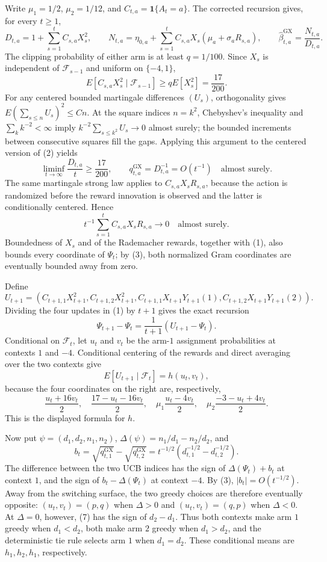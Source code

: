 Write \(\mu_1=1/2\), \(\mu_2=1/12\), and \(C_{t,a}=\mathbf 1\{A_t=a\}\). The corrected recursion gives, for every \(t\ge1\),
\[
 D_{t,a}=1+\sum_{s=1}^t C_{s,a}X_s^2,\qquad
 N_{t,a}=\eta_{0,a}+\sum_{s=1}^t C_{s,a}X_s(\mu_a+\sigma_aR_{s,a}),\qquad
 \widehat\beta^{\mathrm{GX}}_{t,a}=\frac{N_{t,a}}{D_{t,a}}. \tag{1}
\]
The clipping probability of either arm is at least \(q=1/100\). Since \(X_s\) is independent of \(\mathcal F_{s-1}\) and uniform on \(\{-4,1\}\),
\[
 E[C_{s,a}X_s^2\mid\mathcal F_{s-1}]
 \ge qE[X_s^2]=\frac{17}{200}. \tag{2}
\]
For any centered bounded martingale differences \((U_s)\), orthogonality gives \(E(\sum_{s\le n}U_s)^2\le Cn\). At the square indices \(n=k^2\), Chebyshev's inequality and \(\sum_k k^{-2}<\infty\) imply \(k^{-2}\sum_{s\le k^2}U_s\to0\) almost surely; the bounded increments between consecutive squares fill the gaps. Applying this argument to the centered version of (2) yields
\[
 \liminf_{t\to\infty}\frac{D_{t,a}}t\ge\frac{17}{200},
 \qquad q^{\mathrm{GX}}_{t,a}=D_{t,a}^{-1}=O(t^{-1})\quad\text{almost surely}. \tag{3}
\]
The same martingale strong law applies to \(C_{s,a}X_sR_{s,a}\), because the action is randomized before the reward innovation is observed and the latter is conditionally centered. Hence
\[
 t^{-1}\sum_{s=1}^tC_{s,a}X_sR_{s,a}\longrightarrow0
 \quad\text{almost surely}. \tag{4}
\]
Boundedness of \(X_s\) and of the Rademacher rewards, together with (1), also bounds every coordinate of \(\Psi_t\); by (3), both normalized Gram coordinates are eventually bounded away from zero.

Define
\[
 U_{t+1}=(C_{t+1,1}X_{t+1}^2,C_{t+1,2}X_{t+1}^2,
 C_{t+1,1}X_{t+1}Y_{t+1}(1),C_{t+1,2}X_{t+1}Y_{t+1}(2)).
\]
Dividing the four updates in (1) by \(t+1\) gives the exact recursion
\[
 \Psi_{t+1}-\Psi_t=\frac1{t+1}(U_{t+1}-\Psi_t). \tag{5}
\]
Conditional on \(\mathcal F_t\), let \(u_t\) and \(v_t\) be the arm-\(1\) assignment probabilities at contexts \(1\) and \(-4\). Conditional centering of the rewards and direct averaging over the two contexts give
\[
 E[U_{t+1}\mid\mathcal F_t]=h(u_t,v_t), \tag{6}
\]
because the four coordinates on the right are, respectively,
\[
 \frac{u_t+16v_t}{2},\quad \frac{17-u_t-16v_t}{2},\quad
 \mu_1\frac{u_t-4v_t}{2},\quad
 \mu_2\frac{-3-u_t+4v_t}{2}.
\]
This is the displayed formula for \(h\).

Now put \(\psi=(d_1,d_2,n_1,n_2)\), \(\Delta(\psi)=n_1/d_1-n_2/d_2\), and
\[
 b_t=\sqrt{q^{\mathrm{GX}}_{t,1}}-\sqrt{q^{\mathrm{GX}}_{t,2}}
 =t^{-1/2}(d_{t,1}^{-1/2}-d_{t,2}^{-1/2}). \tag{7}
\]
The difference between the two UCB indices has the sign of \(\Delta(\Psi_t)+b_t\) at context \(1\), and the sign of \(b_t-\Delta(\Psi_t)\) at context \(-4\). By (3), \(|b_t|=O(t^{-1/2})\). Away from the switching surface, the two greedy choices are therefore eventually opposite: \((u_t,v_t)=(p,q)\) when \(\Delta>0\) and \((u_t,v_t)=(q,p)\) when \(\Delta<0\). At \(\Delta=0\), however, (7) has the sign of \(d_2-d_1\). Thus both contexts make arm \(1\) greedy when \(d_1<d_2\), both make arm \(2\) greedy when \(d_1>d_2\), and the deterministic tie rule selects arm \(1\) when \(d_1=d_2\). These conditional means are \(h_1,h_2,h_1\), respectively.

